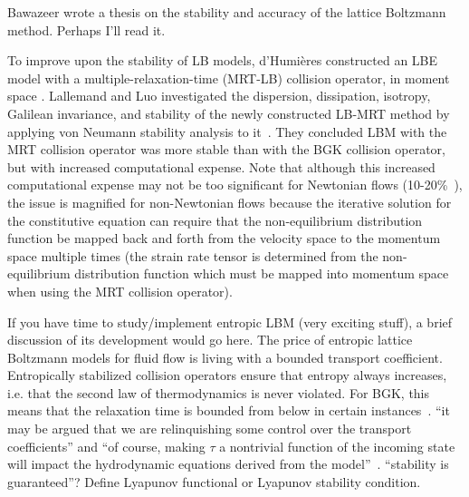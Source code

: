 \documentclass{article}
\begin{document}
{\color{red} Bawazeer wrote a thesis on the stability and accuracy of the lattice Boltzmann method. Perhaps I'll read it.}

To improve upon the stability of LB models, d'Humi\`{e}res constructed an LBE model with a multiple-relaxation-time (MRT-LB) collision operator, in moment space \cite{d1994generalized}. %
Lallemand and Luo investigated the dispersion, dissipation, isotropy, Galilean invariance, and stability of the newly constructed LB-MRT method by applying von Neumann stability analysis to it~\cite{lallemand2000theory}.
They concluded LBM with the MRT collision operator was more stable than with the BGK collision operator, but with increased computational expense. %
Note that although this increased computational expense may not be too significant for Newtonian flows (10-20\%~\cite{lallemand2000theory,d2002multiple}), the issue is magnified for non-Newtonian flows because the iterative solution for the constitutive equation can require that the non-equilibrium distribution function be mapped back and forth from the velocity space to the momentum space multiple times (the strain rate tensor is determined from the non-equilibrium distribution function which must be mapped into momentum space when using the MRT collision operator). %

{\color{red} If you have time to study/implement entropic LBM (very exciting stuff), a brief discussion of its development would go here.}
The price of entropic lattice Boltzmann models for fluid flow is living with a bounded transport coefficient.
Entropically stabilized collision operators ensure that entropy always increases, i.e. that the second law of thermodynamics is never violated.
For BGK, this means that the relaxation time is bounded from below in certain instances~\cite{boghosian2001entropic}.
{\color{red} ``it may be argued that we are relinquishing some control over the transport coefficients'' and ``of course, making $\tau$ a nontrivial function of the incoming state will impact the hydrodynamic equations derived from the model''~\cite{boghosian2001entropic}.
``stability is guaranteed''?
Define Lyapunov functional or Lyapunov stability condition.}
\end{document}
